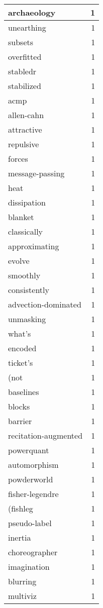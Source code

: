 \begin{table}[h]
\begin{tabular}{|l|r|}
\hline
archaeology & 1 \\
\hline
unearthing & 1 \\
\hline
subsets & 1 \\
\hline
overfitted & 1 \\
\hline
stabledr & 1 \\
\hline
stabilized & 1 \\
\hline
acmp & 1 \\
\hline
allen-cahn & 1 \\
\hline
attractive & 1 \\
\hline
repulsive & 1 \\
\hline
forces & 1 \\
\hline
message-passing & 1 \\
\hline
heat & 1 \\
\hline
dissipation & 1 \\
\hline
blanket & 1 \\
\hline
classically & 1 \\
\hline
approximating & 1 \\
\hline
evolve & 1 \\
\hline
smoothly & 1 \\
\hline
consistently & 1 \\
\hline
advection-dominated & 1 \\
\hline
unmasking & 1 \\
\hline
what's & 1 \\
\hline
encoded & 1 \\
\hline
ticket's & 1 \\
\hline
(not & 1 \\
\hline
baselines & 1 \\
\hline
blocks & 1 \\
\hline
barrier & 1 \\
\hline
recitation-augmented & 1 \\
\hline
powerquant & 1 \\
\hline
automorphism & 1 \\
\hline
powderworld & 1 \\
\hline
fisher-legendre & 1 \\
\hline
(fishleg & 1 \\
\hline
pseudo-label & 1 \\
\hline
inertia & 1 \\
\hline
choreographer & 1 \\
\hline
imagination & 1 \\
\hline
blurring & 1 \\
\hline
multiviz & 1 \\

\end{tabular}
\end{table}
